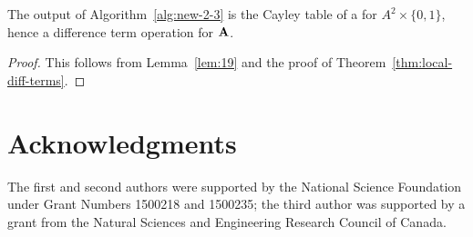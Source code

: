 \documentclass{ws-ijac}
\begin{document}
\begin{proposition}
  The output of Algorithm~\ref{alg:new-2-3} is the Cayley table of a \ldto for $A^2 \times \{0,1\}$, hence a difference term operation for $\mathbf{A}$.
\end{proposition}

\begin{proof}
This follows from Lemma~\ref{lem:19} and the proof of Theorem~\ref{thm:local-diff-terms}.
\end{proof}


\section*{Acknowledgments}
The first and second authors were supported by the National
Science Foundation under Grant Numbers 1500218 and 1500235; the third author was supported by a grant from the Natural Sciences and Engineering Research Council of Canada.





\end{document}
